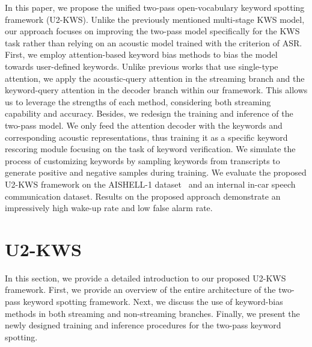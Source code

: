 \documentclass{article}
\begin{document}
In this paper, we propose the unified two-pass open-vocabulary keyword spotting framework (U2-KWS). Unlike the previously mentioned multi-stage KWS model, our approach focuses on improving the two-pass model specifically for the KWS task rather than relying on an acoustic model trained with the criterion of ASR. 
First, we employ attention-based keyword bias methods to bias the model towards user-defined keywords. Unlike previous works that use single-type attention, we apply the acoustic-query attention in the streaming branch and the keyword-query attention in the decoder branch within our framework. This allows us to leverage the strengths of each method, considering both streaming capability and accuracy.
Besides, we redesign the training and inference of the two-pass model.  We only feed the attention decoder with the keywords and corresponding acoustic representations, thus training it as a specific keyword rescoring module focusing on the task of keyword verification. We simulate the process of customizing keywords by sampling keywords from transcripts to generate positive and negative samples during training.
We evaluate the proposed U2-KWS framework on the AISHELL-1 dataset~\cite{aishell1} and an internal in-car speech communication dataset. Results on the proposed approach demonstrate an impressively high wake-up rate and low false alarm rate.

\section{U2-KWS}
\label{sec:method}
In this section, we provide a detailed introduction to our proposed U2-KWS framework. First, we provide an overview of the entire architecture of the two-pass keyword spotting framework. Next, we discuss the use of keyword-bias methods in both streaming and non-streaming branches. Finally, we present the newly designed training and inference procedures for the two-pass keyword spotting.
\end{document}

